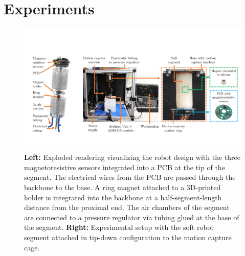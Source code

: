 \section{Experiments}\label{sec:promasens:experiments}
\begin{figure}[hbt]
    \centering
    \includegraphics[width=1.0\textwidth]{promasens/figures/experimental_setup/experimental_setup_v5_compressed.pdf}
    \caption{
    \textbf{Left:} Exploded rendering visualizing the robot design with the three magnetoresistive sensors integrated into a PCB at the tip of the segment. The electrical wires from the PCB are passed through the backbone to the base. A ring magnet attached to a 3D-printed holder is integrated into the backbone at a half-segment-length distance from the proximal end. The air chambers of the segment are connected to a pressure regulator via tubing glued at the base of the segment. \textbf{Right:} Experimental setup with the soft robot segment attached in tip-down configuration to the motion capture cage.
    }\label{fig:promasens:experimental_setup}
\end{figure}
